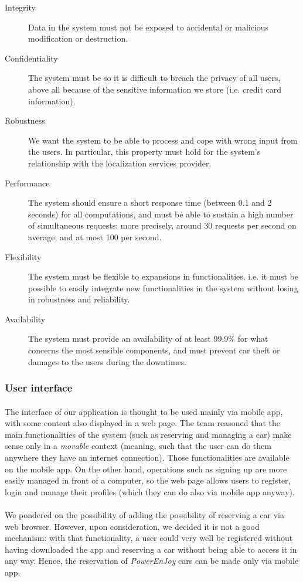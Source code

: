 	\begin{description}
		\item[Integrity] Data in the system must not be exposed to accidental or malicious modification or destruction.
		\item[Confidentiality] The system must be so it is difficult to breach the privacy of all users, above all because of the sensitive information we store (i.e. credit card information).
		\item[Robustness] We want the system to be able to process and cope with wrong input from the users. In particular, this property must hold for the system's relationship with the localization services provider. 
		\item[Performance] The system should ensure a short response time (between 0.1 and 2 seconds) for all computations, and must be able to sustain a high number of simultaneous requests: more precisely, around 30 requests per second on average, and at most 100 per second.
		\item[Flexibility] The system must be flexible to expansions in functionalities, i.e. it must be possible to easily integrate new functionalities in the system without losing in robustness and reliability.
		\item[Availability] The system must provide an availability of at least 99.9\% for what concerns the most sensible components, and must prevent car theft or damages to the users during the downtimes.
	\end{description}

	\subsubsection{User interface}
	\paragraph{}The interface of our application is thought to be used mainly via mobile app, with some content also displayed in a web page. The team reasoned that the main functionalities of the system (such as reserving and managing a car) make sense only in a \textit{movable} context (meaning, such that the user can do them anywhere they have an internet connection). Those functionalities are available on the mobile app. On the other hand, operations such as signing up are more easily managed in front of a computer, so the web page allows users to register, login and manage their profiles (which they can do also via mobile app anyway).
	\paragraph{}We pondered on the possibility of adding the possibility of reserving a car via web browser. However, upon consideration, we decided it is not a good mechanism: with that functionality, a user could very well be registered without having downloaded the app and reserving a car without being able to access it in any way. Hence, the reservation of \textit{PowerEnJoy} cars can be made only via mobile app. 
	
